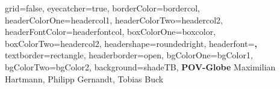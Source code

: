 \documentclass[a0paper,portrait]{baposter}
\begin{document}


\begin{poster}{
	grid=false,
	eyecatcher=true, 
	borderColor=bordercol,
	headerColorOne=headercol1,
	headerColorTwo=headercol2,
	headerFontColor=headerfontcol,
	boxColorOne=boxcolor,
	boxColorTwo=headercol2,
	headershape=roundedright,
	headerfont=\Large\sf\textbf,
	textborder=rectangle,
	headerborder=open,
	bgColorOne=bgColor1,
	bgColorTwo=bgColor2,
	background=shadeTB,
}
{
\setlength\fboxsep{0pt}
\setlength\fboxrule{0.5pt}
}
{
\sf\textbf{\hspace{-4.5em} POV-Globe}
}
{
	\hspace{-7.5em}
	\vspace{1em} Maximilian Hartmann, Philipp Gernandt, Tobias Buck\\
}
\end{poster}
\end{document}
